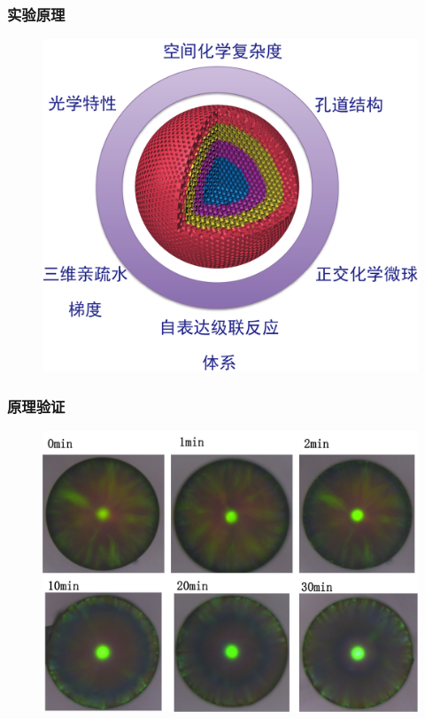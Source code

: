 \documentclass{beamer}
\begin{document}
\begin{frame}
  \frametitle{实验原理}
  \begin{figure}
    \begin{center}
      \includegraphics[height=0.65\linewidth]{figures/schem3-2.png}
    \end{center}
  \end{figure}
\end{frame}

\begin{frame}
  \frametitle{原理验证}
  \begin{figure}
    \begin{center}
      \includegraphics[width=0.70\linewidth]{figures/ch3/Fig1A.png}
    \end{center}
  \end{figure}
\end{frame}
\end{document}
